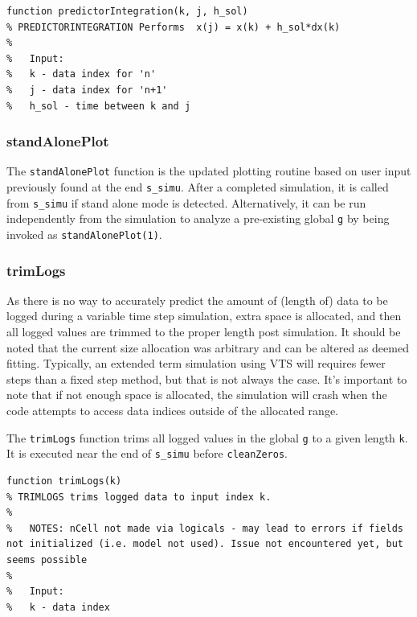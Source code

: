\begin{verbatim}
function predictorIntegration(k, j, h_sol)
% PREDICTORINTEGRATION Performs  x(j) = x(k) + h_sol*dx(k)
%
%   Input:
%   k - data index for 'n'
%   j - data index for 'n+1'
%   h_sol - time between k and j
\end{verbatim}

\subsubsection{standAlonePlot}  
The \verb|standAlonePlot| function is the updated plotting routine based on user input previously found at the end \verb|s_simu|.
After a completed simulation, it is called from \verb|s_simu| if stand alone mode is detected.
Alternatively, it can be run independently from the simulation to analyze a pre-existing global \verb|g| by being invoked as \verb|standAlonePlot(1)|.

\subsubsection{trimLogs}  
As there is no way to accurately predict the amount of (length of) data to be logged during a variable time step simulation, extra space is allocated, and then all logged values are trimmed to the proper length post simulation.
It should be noted that the current size allocation was arbitrary and can be altered as deemed fitting.
Typically, an extended term simulation using VTS will requires fewer steps than a fixed step method, but that is not always the case.
It's important to note that if not enough space is allocated, the simulation will crash when the code attempts to access data indices outside of the allocated range.

The \verb|trimLogs| function trims all logged values in the global \verb|g| to a given length \verb|k|.
It is executed near the end of \verb|s_simu| before \verb|cleanZeros|.

\begin{verbatim}
function trimLogs(k)
% TRIMLOGS trims logged data to input index k.
%
%   NOTES: nCell not made via logicals - may lead to errors if fields not initialized (i.e. model not used). Issue not encountered yet, but seems possible
%
%   Input:
%   k - data index
\end{verbatim} 
